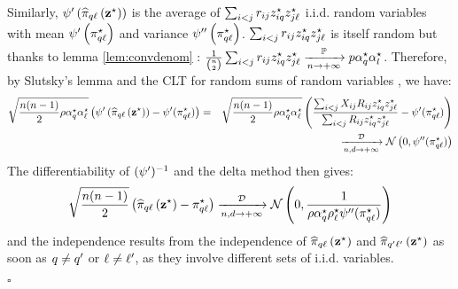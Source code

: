 \documentclass[]{imsart}
\newcommand{\1}{\mathds{1}}
\numberwithin{equation}{section}
\theoremstyle{plain}
\theoremstyle{remark}
\begin{document}
Similarly, $\psi'\left(\widehat{\pi}_{q\ell}\left(\mathbf{z}^\star\right)\right)$ is
the average of $\sum_{i < j} r_{i j} z_{i q}^\star z_{j\ell}^\star$
i.i.d. random variables with mean
$\psi'\left(\pi^\star_{q\ell}\right)$ and variance
$\psi''\left(\pi^\star_{q\ell}\right)$. $\sum_{i < j} r_{i j} z_{i q}^\star z_{j\ell}^\star$
is itself random but thanks to lemma \ref{lem:convdenom} : 
\mbox{$\frac{1}{\binom{n}{2}}\sum_{i < j} r_{ij} z_{i q}^\star z_{j\ell}^\star \xrightarrow[n \to +\infty]{\mathbb{P}} p \alpha^\star_{q}\alpha^\star_{l}$}. Therefore, by Slutsky's lemma and
the CLT for random sums of random variables \cite{Shanthikumar1984}, we have:
\begin{eqnarray*}
\sqrt{\frac{\n(\n-1)}{2}\rho\pii^\star_{\kk}\pii^\star_{\el}} \left(\normp\left(\hal_{\kk\el}\left(\bzs\right)\right) - \normp(\al^\vrai_{\kk\el}) \right)  &=& \sqrt{\frac{\n(\n-1)}{2}\rho\pii^\star_{\kk}\pii^\star_{\el}} \left( \frac{\sum_{\ii < \jj} \Xij \Rij \zik^{\vrai} \zjl^{\vrai}}{\sum_{\ii < \jj} \Rij \ziq^\star \zjl^\star} - \normp(\al^\vrai_{\kk\el}) \right) \\
&& \xrightarrow[\n,\dd \to +\infty]{\mathcal{D}} \mcN\left(0, \normp'(\al^\vrai_{\kk\el})\right)
\end{eqnarray*}
The differentiability of $(\psi')^{-1}$ and the delta method then gives:
\begin{equation*}
  \sqrt{\frac{\n(\n-1)}{2}} \left(\hal_{\kk\el}\left(\bzs\right) - \al^\vrai_{\kk\el} \right) \xrightarrow[\n,\dd \to +\infty]{\mathcal{D}} \mcN\left(0, \frac{1}{\rho\pii^\star_{\kk}\rhoo^\star_{\el} \normp'(\al^\vrai_{\kk\el})}\right)
\end{equation*}
and the independence results from the independence of $\widehat{\pi}_{q\ell}\left(\mathbf{z}^\star\right)$ and
$\widehat{\pi}_{q'\ell'}\left(\mathbf{z}^\star\right)$ as soon as $q \neq q'$ or $\ell
\neq \ell'$, as they involve different sets of i.i.d. variables.

\begin{flushright}
$\square$
\end{flushright}
\end{document}
